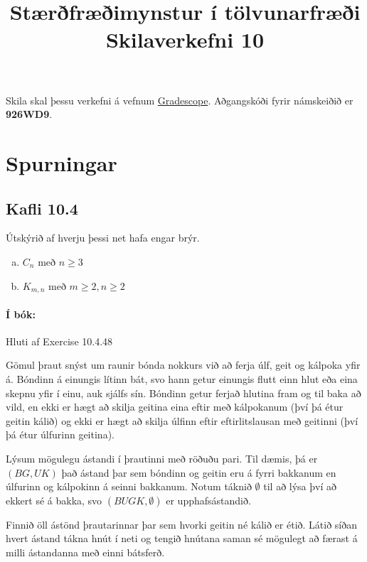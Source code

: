 \documentclass{exam}
\title{Stærðfræðimynstur í tölvunarfræði \\ Skilaverkefni 10}
\author{}
\begin{document}
\maketitle
\thispagestyle{empty} 

Skila skal þessu verkefni á vefnum \href{https://gradescope.com/}{Gradescope}. Aðgangskóði fyrir námskeiðið er \textbf{926WD9}.


\section{Spurningar}

\begin{questions}

\section{Kafli 10.4}

\question Útskýrið af hverju þessi net hafa engar brýr.

\begin{enumerate}[a)]
 \item $C_n$ með $n \geq 3$
 \item $K_{m,n}$ með $m \geq 2, n \geq 2$
\end{enumerate}

\paragraph{Í bók:} Hluti af Exercise 10.4.48

\question Gömul þraut snýst um raunir bónda nokkurs við að ferja úlf, geit og kálpoka yfir á. Bóndinn á einungis lítinn bát, svo hann getur einungis flutt einn hlut eða eina skepnu yfir í einu, auk sjálfs sín. Bóndinn getur ferjað hlutina fram og til baka að vild, en ekki er hægt að skilja geitina eina eftir með kálpokanum (því þá étur geitin kálið) og ekki er hægt að skilja úlfinn eftir eftirlitslausan með geitinni (því þá étur úlfurinn geitina).

Lýsum mögulegu ástandi í þrautinni með röðuðu pari. Til dæmis, þá er $(BG,UK)$ það ástand þar sem bóndinn og geitin eru á fyrri bakkanum en úlfurinn og kálpokinn á seinni bakkanum. Notum táknið $\emptyset$ til að lýsa því að ekkert sé á bakka, svo $(BUGK, \emptyset)$ er upphafsástandið.

Finnið öll ástönd þrautarinnar þar sem hvorki geitin né kálið er étið. Látið síðan hvert ástand tákna hnút í neti og tengið hnútana saman sé mögulegt að færast á milli ástandanna með einni bátsferð.


\end{questions}
\end{document}
